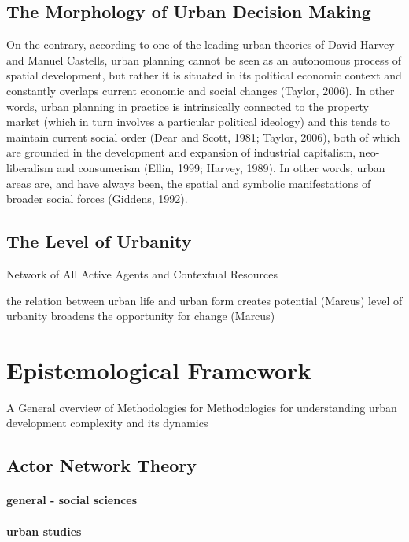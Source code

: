 \documentclass[11pt]{report}
\begin{document}
\subsection{The Morphology of Urban Decision Making}
On the contrary, according to one of the leading urban theories of David Harvey and Manuel Castells, urban planning cannot be seen as an autonomous process of spatial development, but rather it is situated in its political economic context and constantly overlaps current economic and social changes  (Taylor, 2006). In other words, urban planning in practice is intrinsically connected to the property market (which in turn involves a particular political ideology) and this tends to maintain current social order (Dear and Scott, 1981; Taylor, 2006), both of which are grounded in the development and expansion of industrial capitalism, neo-liberalism and consumerism (Ellin, 1999; Harvey, 1989). In other words, urban areas are, and have always been, the spatial and symbolic manifestations of broader social forces (Giddens, 1992).

\subsection{The Level of Urbanity}

Network of All Active Agents and Contextual Resources

the relation between urban life and urban form creates potential (Marcus)
level of urbanity broadens the opportunity for change (Marcus)

\section{Epistemological Framework}

A General overview of Methodologies for 
Methodologies for understanding urban development complexity and its dynamics

\subsection{Actor Network Theory}

\paragraph{general - social sciences}

\paragraph{urban studies}
\end{document}
